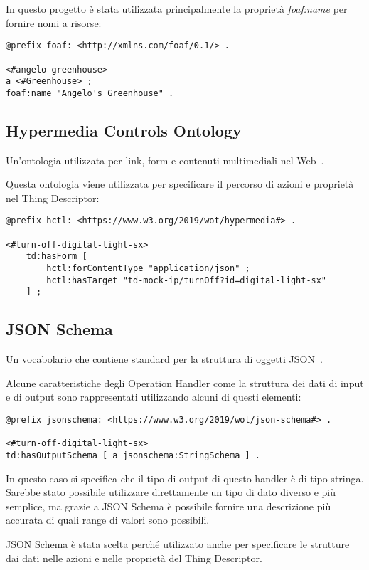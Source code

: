 \noindent In questo progetto è stata utilizzata principalmente la proprietà \textit{foaf:name} per fornire nomi a risorse:
\begin{verbatim}
@prefix foaf: <http://xmlns.com/foaf/0.1/> .

<#angelo-greenhouse>
a <#Greenhouse> ;
foaf:name "Angelo's Greenhouse" .
\end{verbatim}

\subsection{Hypermedia Controls Ontology}
Un'ontologia utilizzata per link, form e contenuti multimediali nel Web~\cite{Hypermed84:online}.

\noindent Questa ontologia viene utilizzata per specificare il percorso di azioni e proprietà nel Thing Descriptor:
\begin{verbatim}
@prefix hctl: <https://www.w3.org/2019/wot/hypermedia#> .

<#turn-off-digital-light-sx>
	td:hasForm [
		hctl:forContentType "application/json" ;
		hctl:hasTarget "td-mock-ip/turnOff?id=digital-light-sx"
	] ;
\end{verbatim}

\subsection{JSON Schema}
Un vocabolario che contiene standard per la struttura di oggetti JSON~\cite{JSONSche6:online}.

\noindent Alcune caratteristiche degli Operation Handler come la struttura dei dati di input e di output sono rappresentati utilizzando alcuni di questi elementi:
\begin{verbatim}
@prefix jsonschema: <https://www.w3.org/2019/wot/json-schema#> .

<#turn-off-digital-light-sx>
td:hasOutputSchema [ a jsonschema:StringSchema ] .
\end{verbatim}
\noindent In questo caso si specifica che il tipo di output di questo handler è di tipo stringa. Sarebbe stato possibile utilizzare direttamente un tipo di dato diverso e più semplice, ma grazie a JSON Schema è possibile fornire una descrizione più accurata di quali range di valori sono possibili.

\noindent JSON Schema è stata scelta perché utilizzato anche per specificare le strutture dai dati nelle azioni e nelle proprietà del Thing Descriptor.

